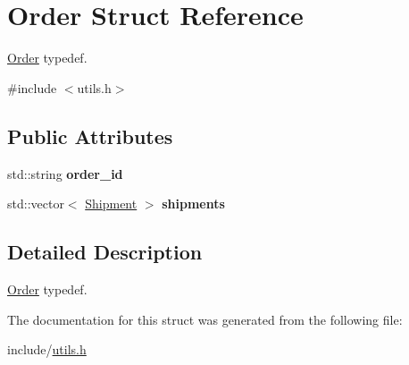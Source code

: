 \hypertarget{structOrder}{}\section{Order Struct Reference}
\label{structOrder}


\hyperlink{structOrder}{Order} typedef.  




{\ttfamily \#include $<$utils.\+h$>$}

\subsection*{Public Attributes}
\begin{DoxyCompactItemize}
\item 
\mbox{\label{structOrder_aa2961688ae8617be73ff5c9686f3cc36}} 
std\+::string {\bfseries order\+\_\+id}
\item 
\mbox{\label{structOrder_a325df31af4ce3ebaa72b06585e5f100a}} 
std\+::vector$<$ \hyperlink{structShipment}{Shipment} $>$ {\bfseries shipments}
\end{DoxyCompactItemize}


\subsection{Detailed Description}
\hyperlink{structOrder}{Order} typedef. 

The documentation for this struct was generated from the following file\+:\begin{DoxyCompactItemize}
\item 
include/\hyperlink{utils_8h}{utils.\+h}\end{DoxyCompactItemize}
